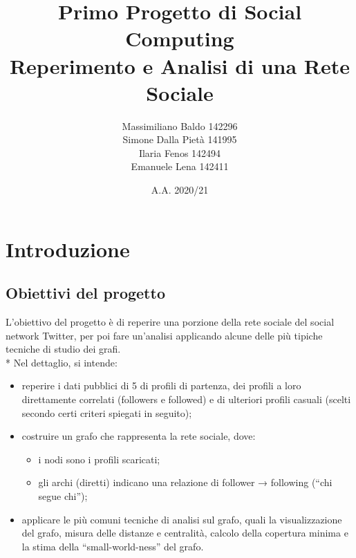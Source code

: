 \documentclass[a4paper, 12pt, twoside]{article}
\title{Primo Progetto di Social Computing\\Reperimento e Analisi di una Rete Sociale}
\author{Massimiliano Baldo 142296\\
        Simone Dalla Pietà 141995\\
        Ilaria Fenos 142494\\
        Emanuele Lena 142411
        }
\date{A.A. 2020/21}
\begin{document}
\maketitle
\tableofcontents
\thispagestyle{empty}  %
\newpage               %
\setcounter{page}{1}   %

\section{Introduzione} \label{sec:intro}


\subsection{Obiettivi del progetto}
L’obiettivo del progetto è di reperire una porzione della rete sociale del social network  Twitter, per poi fare un’analisi applicando alcune delle più tipiche tecniche di studio dei grafi. \\*
Nel dettaglio, si intende:
\begin{itemize}
    \item reperire i dati pubblici di 5 di profili di partenza, dei profili a loro direttamente correlati (followers e followed) e di ulteriori profili casuali (scelti secondo certi criteri spiegati in seguito);
    \item costruire un grafo che rappresenta la rete sociale, dove:
    \begin{itemize}
        \item i nodi sono i profili scaricati;
        \item gli archi (diretti) indicano una relazione di follower → following (“chi segue chi”);
    \end{itemize}
    \item applicare le più comuni tecniche di analisi sul grafo, quali la visualizzazione del grafo, misura delle distanze e centralità, calcolo della copertura minima e la stima della “small-world-ness” del grafo.
    
\end{itemize} %
\end{document}
